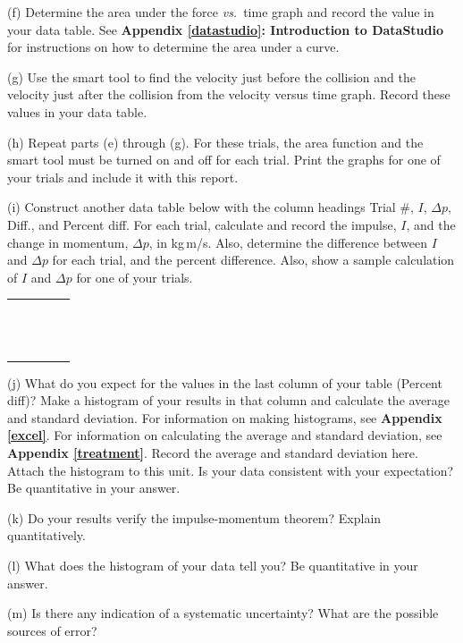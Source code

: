 (f) Determine the area under the force \textit{vs.}~time graph and record the value in
your data table. See \textbf{Appendix \ref{datastudio}: Introduction to DataStudio} for instructions on how to determine the area under a curve.

(g) Use the smart tool to find the velocity just before the collision and the
velocity just after the collision from the velocity versus time graph. Record
these values in your data table.

(h) Repeat parts (e) through (g). For these trials, 
the area function and the smart tool must be turned on and off for each trial. 
Print the graphs for one of your trials and include it with this report.

\newpage

(i) Construct another data table below with the column headings
Trial \#, $I$, \( \Delta  p\), Diff., and Percent diff. For each trial, calculate and record
the impulse, $I$, and the change in momentum, \( \Delta  p\), in kg\,m/s. Also,
determine the difference between $I$ and $\Delta p$  for each trial, and the percent difference. Also, show a sample
calculation of $I$ and \( \Delta  p\) for one of your trials.

\begin{center}
\begin{tabular}{|p{1.0in}|p{1.0in}|p{1.0in}|p{1.0in}|p{1.0in}|} \hline
 & & & & \\ \hline
 & & & & \\
 & & & & \\
 & & & & \\
 & & & & \\
 & & & & \\
 & & & & \\
 & & & & \\
 & & & & \\
 & & & & \\
 & & & & \\
 & & & & \\
 & & & & \\
 & & & & \\ \hline
\end{tabular}
\end{center}

(j) What do you expect for the values in the last column of your table (Percent diff)? Make a histogram of your results in that column and calculate the average and standard deviation. For information on making histograms, see \textbf{Appendix \ref{excel}}. For information on calculating the average and standard deviation, see \textbf{Appendix \ref{treatment}}. Record the average and standard deviation here.
Attach the histogram to this unit.
Is your data consistent with your expectation?  Be quantitative in your answer.
\vspace{20mm}

(k) Do your results verify the impulse-momentum theorem? Explain quantitatively.
\vspace{20mm}

(l) What does the histogram of your data tell you? Be quantitative in your answer.
\vspace{20mm}

(m) Is there any indication of a systematic uncertainty? What are the possible
sources of error?

